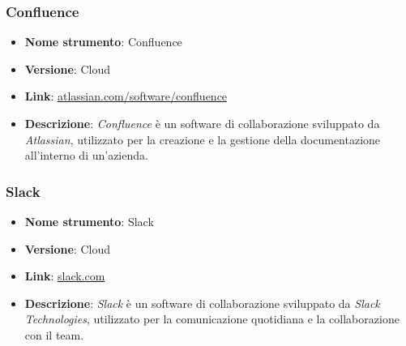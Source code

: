 \subsubsection{Confluence}
\begin{itemize}
      \item \textbf{Nome strumento}: Confluence
      \item \textbf{Versione}: Cloud
      \item \textbf{Link}: \href{https://www.atlassian.com/software/confluence}{atlassian.com/software/confluence}
      \item \textbf{Descrizione}: \textit{Confluence} è un software di collaborazione sviluppato da \textit{Atlassian}, utilizzato per la creazione e la gestione della documentazione
            all'interno di un'azienda.
\end{itemize}

\subsubsection{Slack}
\begin{itemize}
      \item \textbf{Nome strumento}: Slack
      \item \textbf{Versione}: Cloud
      \item \textbf{Link}: \href{https://slack.com/}{slack.com}
      \item \textbf{Descrizione}: \textit{Slack} è un software di collaborazione sviluppato da \textit{Slack Technologies}, utilizzato per la comunicazione quotidiana e la collaborazione
            con il team.
\end{itemize}

